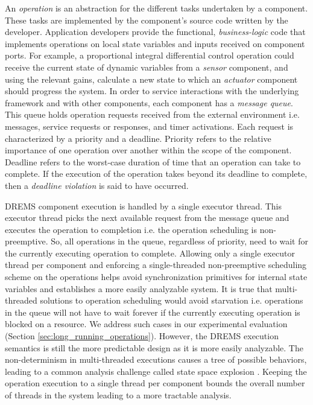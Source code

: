 An \emph{operation} is an abstraction for the different tasks undertaken by a component. These tasks are implemented by the component's source code written by the developer. Application developers provide the functional, \emph{business-logic} code that implements operations on local state variables and inputs received on component ports. For example, a proportional integral differential control operation could receive the current state of dynamic variables from a \emph{sensor} component, and using the relevant gains, calculate a new state to which an \emph{actuator} component should progress the system. In order to service interactions with the underlying framework and with other components, each component has a \emph{message queue}. This queue holds operation requests received from the external environment i.e. messages, service requests or responses, and timer activations. Each request is characterized by a priority and a deadline. Priority refers to the relative importance of one operation over another within the scope of the component. Deadline refers to the worst-case duration of time that an operation can take to complete. If the execution of the operation takes beyond its deadline to complete, then a \emph{deadline violation} is said to have occurred.   

DREMS component execution is handled by a single executor thread. This executor thread picks the next available request from the message queue and executes the operation to completion i.e. the operation scheduling is non-preemptive. So, all operations in the queue, regardless of priority, need to wait for the currently executing operation to complete. Allowing only a single executor thread per component and enforcing a single-threaded non-preemptive scheduling scheme on the operations helps avoid synchronization primitives for internal state variables and establishes a more easily analyzable system. It is true that multi-threaded solutions to operation scheduling would avoid starvation i.e. operations in the queue will not have to wait forever if the currently executing operation is blocked on a resource. We address such cases in our experimental evaluation (Section \ref{sec:long_running_operations}). However, the DREMS execution semantics is still the more predictable design as it is more easily analyzable. The non-determinism in multi-threaded executions causes a tree of possible behaviors, leading to a common analysis challenge called state space explosion \cite{lin1987protocol}. Keeping the operation execution to a single thread per component bounds the overall number of threads in the system leading to a more tractable analysis. 

